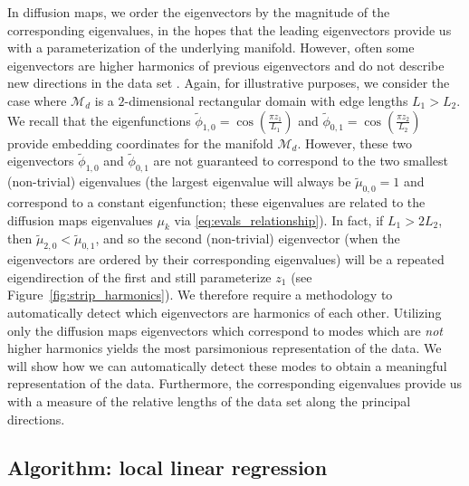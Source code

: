 \documentclass[preprint]{elsarticle}
\begin{document}
In diffusion maps, we order the eigenvectors by the magnitude of the corresponding eigenvalues, in the hopes that the leading eigenvectors provide us with a parameterization of the underlying manifold.
%
However, often some eigenvectors are higher harmonics of previous eigenvectors and do not describe new directions in the data set \cite{gerber2007robust}.
%
Again, for illustrative purposes, we consider the case where $\mathcal{M}_d$ is a $2$-dimensional rectangular domain with edge lengths $L_1  > L_2$. 
%
We recall that the eigenfunctions $\tilde{\phi}_{1,0} = \cos \left( \frac {\pi z_1}{L_1} \right)$ and  $\tilde{\phi}_{0,1} = \cos \left( \frac {\pi z_2}{L_2} \right)$ provide embedding coordinates for the manifold $\mathcal{M}_d$. 
%
However, these two eigenvectors $\tilde{\phi}_{1, 0}$ and $\tilde{\phi}_{0, 1}$ are not guaranteed to correspond to the two smallest (non-trivial) eigenvalues (the largest eigenvalue will always be $\tilde{\mu}_{0,0} = 1$ and correspond to a constant eigenfunction; these eigenvalues are related to the diffusion maps eigenvalues $\mu_k$ via \eqref{eq:evals_relationship}). 
%
In fact, if $L_1 > 2 L_2$, then $\tilde{\mu}_{2, 0} < \tilde{\mu}_{0, 1}$, and so the second (non-trivial) eigenvector (when the eigenvectors are ordered by their corresponding eigenvalues) will be a repeated eigendirection of the first and still parameterize $z_1$ (see Figure~\ref{fig:strip_harmonics}).
%
We therefore require a methodology to automatically detect which eigenvectors are harmonics of each other. 
%
Utilizing only the diffusion maps eigenvectors which correspond to modes which are {\em not} higher harmonics yields the most parsimonious representation of the data.
%
We will show how we can automatically detect these modes to obtain a meaningful representation of the data.
%
Furthermore, the corresponding eigenvalues provide us with a measure of the relative lengths of the data set along the principal directions. 


\subsection{Algorithm: local linear regression}
\end{document}
